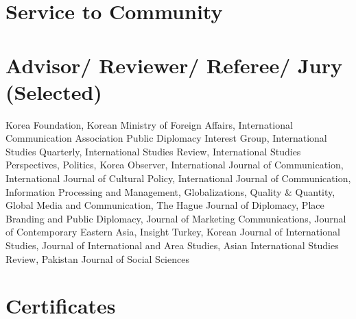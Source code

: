 \documentclass[11pt,a4paper,]{awesome-cv}
\begin{document}
\hypertarget{service-to-community}{%
\section{Service to Community}\label{service-to-community}}

\begin{cventries}
    \vspace{-4.0mm}
    \vspace{-4.0mm}
    \vspace{-4.0mm}
    \vspace{-4.0mm}
\end{cventries}

\hypertarget{advisor-reviewer-referee-jury-selected}{%
\section{Advisor/ Reviewer/ Referee/ Jury
(Selected)}\label{advisor-reviewer-referee-jury-selected}}

Korea Foundation, Korean Ministry of Foreign Affairs, International
Communication Association Public Diplomacy Interest Group, International
Studies Quarterly, International Studies Review, International Studies
Perspectives, Politics, Korea Observer, International Journal of
Communication, International Journal of Cultural Policy, International
Journal of Communication, Information Processing and Management,
Globalizations, Quality \& Quantity, Global Media and Communication, The
Hague Journal of Diplomacy, Place Branding and Public Diplomacy, Journal
of Marketing Communications, Journal of Contemporary Eastern Asia,
Insight Turkey, Korean Journal of International Studies, Journal of
International and Area Studies, Asian International Studies Review,
Pakistan Journal of Social Sciences

\hypertarget{certificates}{%
\section{Certificates}\label{certificates}}
\end{document}
